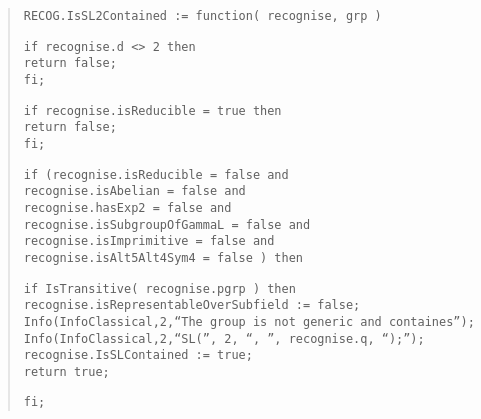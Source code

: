 \documentclass[a4paper,11pt]{article}
\theoremstyle{bla}
\begin{document}
\begin{quote}
\hspace*{-0.3cm} \texttt{RECOG.IsSL2Contained := function( recognise, grp )}

  \texttt{if recognise.d <> 2 then}\\
    \hspace*{0.3cm} \texttt{return false;}\\
  \texttt{fi;}

  \texttt{if recognise.isReducible = true then}\\
    \hspace*{0.3cm} \texttt{return false;}\\
  \texttt{fi;}

  \texttt{if (recognise.isReducible = false and}\\
  \hspace*{0.1cm} \texttt{recognise.isAbelian = false and}\\
  \hspace*{0.1cm} \texttt{recognise.hasExp2 = false and}\\
  \hspace*{0.1cm} \texttt{recognise.isSubgroupOfGammaL = false and}\\
  \hspace*{0.1cm} \texttt{recognise.isImprimitive = false and}\\
  \hspace*{0.1cm} \texttt{recognise.isAlt5Alt4Sym4 = false ) then}

    \hspace*{0.3cm} \texttt{if IsTransitive( recognise.pgrp ) then}\\
      \hspace*{0.6cm} \texttt{recognise.isRepresentableOverSubfield := false;}\\
      \hspace*{0.6cm} \texttt{Info(InfoClassical,2,``The group is not generic and containes'');}\\
      \hspace*{0.6cm} \texttt{Info(InfoClassical,2,``SL('', 2, ``, '', recognise.q, ``);'');}\\
      \hspace*{0.6cm} \texttt{recognise.IsSLContained := true;}\\
      \hspace*{0.6cm} \texttt{return true;}

    \hspace*{0.3cm} \texttt{fi;}


\end{quote}
\end{document}
